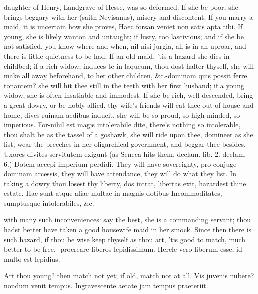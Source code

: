 {daughter of Henry, Landgrave of Hesse, was so deformed. If she be poor,
she brings beggary with her (saith Nevisanus), misery and discontent.
If you marry a maid, it is uncertain how she proves, Haec forsan veniet
non satis apta tibi. If young, she is likely wanton and untaught;
if lusty, too lascivious; and if she be not satisfied, you know where
and when, nil nisi jurgia, all is in an uproar, and there is little
quietness to be had; If an old maid, 'tis a hazard she dies in
childbed; if a rich widow, induces te in laqueum, thou dost
halter thyself, she will make all away beforehand, to her other
children, \&c.-dominam quis possit ferre tonantem? she will hit
thee still in the teeth with her first husband; if a young widow, she
is often insatiable and immodest. If she be rich, well descended, bring
a great dowry, or be nobly allied, thy wife's friends will eat thee out
of house and home, dives ruinam aedibus inducit, she will be so proud,
so high-minded, so imperious. For-nihil est magis intolerabile dite,
there's nothing so intolerable, thou shalt be as the tassel of a
goshawk, she will ride upon thee, domineer as she list, wear the
breeches in her oligarchical government, and beggar thee besides.
Uxores divites servitutem exigunt (as Seneca hits them, declam. lib. 2.
declam. 6.)-Dotem accepi imperium perdidi. They will have sovereignty,
pro conjuge dominam arcessis, they will have attendance, they will do
what they list. In taking a dowry thou losest thy liberty, dos
intrat, libertas exit, hazardest thine estate.
Hae sunt atque aliae multae in magnis dotibus
Incommoditates, sumptusque intolerabiles, \&c.

with many such inconveniences: say the best, she is a commanding
servant; thou hadst better have taken a good housewife maid in her
smock. Since then there is such hazard, if thou be wise keep thyself as
thou art, 'tis good to match, much better to be free.
-procreare liberos lepidissimum.
Hercle vero liberum esse, id multo est lepidius.

Art thou young? then match not yet; if old, match not at all.
Vis juvenis nubere? nondum venit tempus.
Ingravescente aetate jam tempus praeteriit.

}

